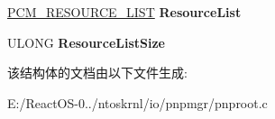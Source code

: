 \begin{DoxyCompactItemize}
\item 
\mbox{\label{struct___p_n_p_r_o_o_t___d_e_v_i_c_e_a04079d7a32242f07a8e87f1c0f4b61f1}} 
\hyperlink{struct___c_m___r_e_s_o_u_r_c_e___l_i_s_t}{P\+C\+M\+\_\+\+R\+E\+S\+O\+U\+R\+C\+E\+\_\+\+L\+I\+ST} {\bfseries Resource\+List}
\item 
\mbox{\label{struct___p_n_p_r_o_o_t___d_e_v_i_c_e_a4b607155d98a3147644032facc87ebe4}} 
U\+L\+O\+NG {\bfseries Resource\+List\+Size}
\end{DoxyCompactItemize}


该结构体的文档由以下文件生成\+:\begin{DoxyCompactItemize}
\item 
E\+:/\+React\+O\+S-\/0../ntoskrnl/io/pnpmgr/pnproot.\+c\end{DoxyCompactItemize}
